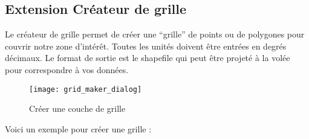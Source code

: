 \subsection{Extension Créateur de grille}


Le créateur de grille permet de créer une ``grille'' de points ou de polygones
pour couvrir notre zone d'intérêt. Toutes les unités doivent être entrées en
degrés décimaux. Le format de sortie est le shapefile qui peut être projeté à la
volée pour correspondre à vos données.

\begin{figure}[ht]
\begin{center}
  \caption{Créer une couche de grille
\nixcaption}\label{fig:graticule}\smallskip
  \texttt{[image: grid\_maker\_dialog]}
\end{center}
\end{figure}

Voici un exemple pour créer une grille :

